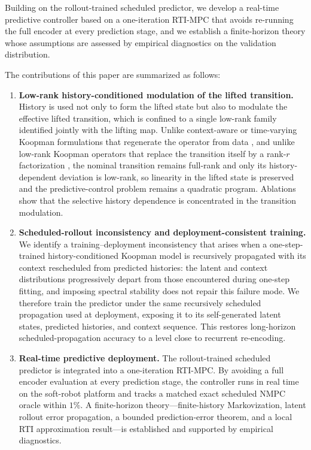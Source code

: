 Building on the rollout-trained scheduled predictor, we develop a real-time predictive controller based on a one-iteration RTI-MPC that avoids re-running the full encoder at every prediction stage, and we establish a finite-horizon theory whose assumptions are assessed by empirical diagnostics on the validation distribution.

The contributions of this paper are summarized as follows:
\begin{enumerate}
\item \textbf{Low-rank history-conditioned modulation of the lifted transition.} History is used not only to form the lifted state but also to modulate the effective lifted transition, which is confined to a single low-rank family identified jointly with the lifting map. Unlike context-aware or time-varying Koopman formulations that regenerate the operator from data \cite{liu2023koopa, li2025mamko}, and unlike low-rank Koopman operators that replace the transition itself by a rank-$r$ factorization \cite{forootani2026spectral}, the nominal transition remains full-rank and only its history-dependent deviation is low-rank, so linearity in the lifted state is preserved and the predictive-control problem remains a quadratic program. Ablations show that the selective history dependence is concentrated in the transition modulation.
\item \textbf{Scheduled-rollout inconsistency and deployment-consistent training.} We identify a training--deployment inconsistency that arises when a one-step-trained history-conditioned Koopman model is recursively propagated with its context rescheduled from predicted histories: the latent and context distributions progressively depart from those encountered during one-step fitting, and imposing spectral stability does not repair this failure mode. We therefore train the predictor under the same recursively scheduled propagation used at deployment, exposing it to its self-generated latent states, predicted histories, and context sequence. This restores long-horizon scheduled-propagation accuracy to a level close to recurrent re-encoding.
\item \textbf{Real-time predictive deployment.} The rollout-trained scheduled predictor is integrated into a one-iteration RTI-MPC. By avoiding a full encoder evaluation at every prediction stage, the controller runs in real time on the soft-robot platform and tracks a matched exact scheduled NMPC oracle within $1\%$. A finite-horizon theory---finite-history Markovization, latent rollout error propagation, a bounded prediction-error theorem, and a local RTI approximation result---is established and supported by empirical diagnostics.
\end{enumerate}

